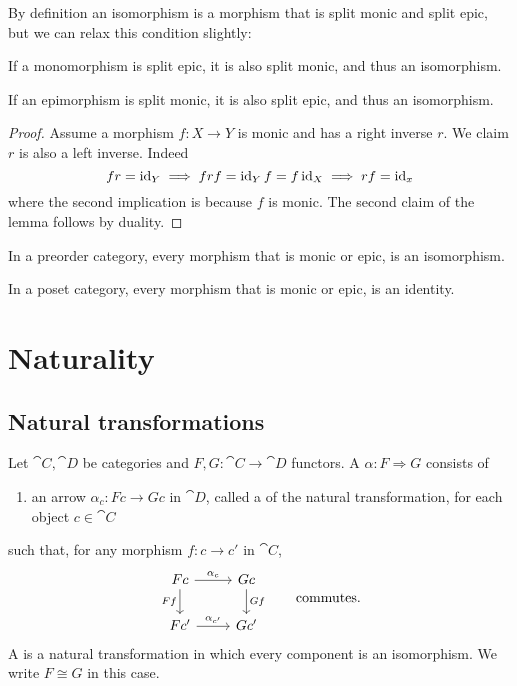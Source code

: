 By definition an isomorphism is a morphism that is split monic and split epic, but we can relax this condition slightly:
\begin{lemma} \label{singleSplitImpliesDoubleSplit}
If a monomorphism is split epic, it is also split monic, and thus an isomorphism.

If an epimorphism is split monic, it is also split epic, and thus an isomorphism.
\end{lemma}
\begin{proof}
Assume a morphism $f:X\to Y$ is monic and has a right inverse $r$. We claim $r$ is also a left inverse. Indeed
\[ fr = \operatorname{id}_Y \implies frf = \operatorname{id}_Yf = f\operatorname{id}_X \implies rf = \operatorname{id}_x  \]
where the second implication is because $f$ is monic. The second claim of the lemma follows by duality.
\end{proof}


\begin{lemma}
In a preorder category, every morphism that is monic or epic, is an isomorphism.

In a poset category, every morphism that is monic or epic, is an identity.
\end{lemma}






\section{Naturality}
\subsection{Natural transformations}
\begin{definition}
Let $\cat{C}, \cat{D}$ be categories and $F,G: \cat{C}\to \cat{D}$ functors. A  $\alpha: F \Rightarrow G$ consists of
\begin{enumerate}
\item an arrow $\alpha_c: Fc\to Gc$ in $\cat{D}$, called a  of the natural transformation, for each object $c\in \cat{C}$
\end{enumerate}
such that, for any morphism $f:c\to c'$ in $\cat{C}$, 
\[ \begin{tikzcd}
Fc \ar[r, "\alpha_c"] \ar[d, swap, "Ff"] & Gc \ar[d, "Gf"] \\
Fc' \ar[r, "\alpha_{c'}"] & Gc'
\end{tikzcd} \qquad \text{commutes}.\]
A  is a natural transformation in which every component is an isomorphism. We write $F\cong G$ in this case.
\end{definition}

